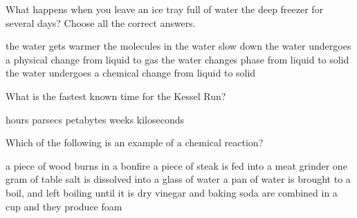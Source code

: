 \documentclass[11pt,addpoints]{exam}   	%
\begin{document}
\begin{questions}
\vspace{.2in}


\question[5]
What happens when you leave an ice tray full of water the deep freezer for several days?
Choose all the correct answers.

\begin{choices}
\choice the water gets warmer
\choice the molecules in the water slow down
\choice the water undergoes a physical change from liquid to gas
\choice the water changes phase from liquid to solid
\choice the water undergoes a chemical change from liquid to solid
\end{choices}
\vspace{.2in}

\question[1] 
What is the fastest known time for the Kessel Run?

\begin{choices}
 hours
 parsecs
 petabytes
 weeks
 kiloseconds
\end{choices}
\vspace{.2in}

\question[5]
Which of the following is an example of a chemical reaction?

\begin{choices}
\choice a piece of wood burns in a bonfire
\choice a piece of steak is fed into a meat grinder
\choice one gram of table salt is dissolved into a glass of water
\choice a pan of water is brought to a boil, and left boiling until it is dry
\choice vinegar and baking soda are combined in a cup and they produce foam
\end{choices}
\vspace{.2in}
\pagebreak


\end{questions}
\end{document}
